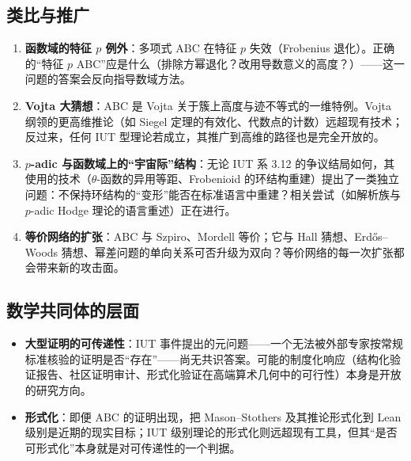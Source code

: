 \subsection{类比与推广}

\begin{enumerate}[label=(\arabic*)]
    \item \textbf{函数域的特征 $p$ 例外}：多项式 ABC 在特征 $p$ 失效（Frobenius 退化）。正确的“特征 $p$ ABC”应是什么（排除方幂退化？改用导数意义的高度？）——这一问题的答案会反向指导数域方法。
    \item \textbf{Vojta 大猜想}：ABC 是 Vojta 关于簇上高度与迹不等式的一维特例。Vojta 纲领的更高维推论（如 Siegel 定理的有效化、代数点的计数）远超现有技术；反过来，任何 IUT 型理论若成立，其推广到高维的路径也是完全开放的。
    \item \textbf{$p$-adic 与函数域上的“宇宙际”结构}：无论 IUT 系 3.12 的争议结局如何，其使用的技术（$\theta$-函数的异用等距、Frobenioid 的环结构重建）提出了一类独立问题：不保持环结构的“变形”能否在标准语言中重建？相关尝试（如解析族与 $p$-adic Hodge 理论的语言重述）正在进行。
    \item \textbf{等价网络的扩张}：ABC 与 Szpiro、Mordell 等价；它与 Hall 猜想、Erd\H{o}s--Woods 猜想、幂差问题的单向关系可否升级为双向？等价网络的每一次扩张都会带来新的攻击面。
\end{enumerate}

\subsection{数学共同体的层面}

\begin{itemize}
    \item \textbf{大型证明的可传递性}：IUT 事件提出的元问题——一个无法被外部专家按常规标准核验的证明是否“存在”——尚无共识答案。可能的制度化响应（结构化验证报告、社区证明审计、形式化验证在高端算术几何中的可行性）本身是开放的研究方向。
    \item \textbf{形式化}：即便 ABC 的证明出现，把 Mason--Stothers 及其推论形式化到 Lean 级别是近期的现实目标；IUT 级别理论的形式化则远超现有工具，但其“是否可形式化”本身就是对可传递性的一个判据。
\end{itemize}
